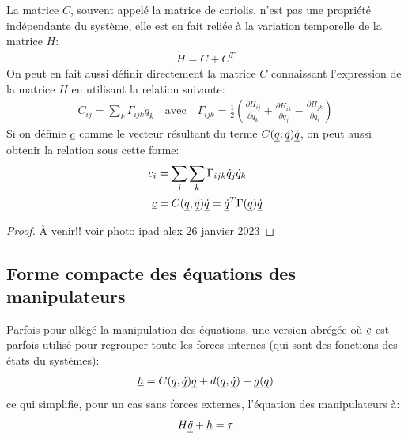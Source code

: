 La matrice $C$, souvent appelé la matrice de coriolis, n'est pas une propriété indépendante du système, elle est en fait reliée à la variation temporelle de la matrice $H$:
\begin{align}
\dot{H} = C + C^T
\label{eq:cener}
\end{align}
On peut en fait aussi définir directement la matrice $C$ connaissant l'expression de la matrice $H$ en utilisant la relation suivante:
\begin{align}
C_{ij} = \sum_k \Gamma_{ijk} \dot{q}_k \quad \text{avec} \quad \Gamma_{ijk} = \frac{1}{2}\left(  \frac{\partial H_{ij}}{\partial q_k} + \frac{\partial H_{ik}}{\partial q_j} - \frac{\partial H_{jk}}{\partial q_i}   \right)
\end{align}
Si on définie $\underline{c}$ comme le vecteur résultant du terme $C(\underline{q},\underline{\dot{q}})\underline{\dot{q}}$, on peut aussi obtenir la relation sous cette forme:
\begin{align}
c_i &= \sum_j \sum_k \Gamma_{ijk} \dot{q}_j \dot{q}_k \\ 
\underline{c} &= C(\underline{q},\underline{\dot{q}})\underline{\dot{q}} = \underline{\dot{q}}^T \Gamma(\underline{q}) \underline{\dot{q}}
\end{align}

\begin{proof}
À venir!! voir photo ipad alex 26 janvier 2023
\end{proof}

%


\newpage
\subsection{Forme compacte des équations des manipulateurs}

Parfois pour allégé la manipulation des équations, une version abrégée où $\underline{c}$ est parfois utilisé pour regrouper toute les forces internes (qui sont des fonctions des états du systèmes):
\begin{align}
\underline{h} = C(\underline{q},\underline{\dot{q}}) \underline{\dot{q}} + d(\underline{q}, \underline{\dot{q}}) + \underline{g}(\underline{q})
\end{align}
ce qui simplifie, pour un cas sans forces externes, l'équation des manipulateurs à:
\begin{align}
H \underline{\ddot{q}} + \underline{h} = \underline{\tau} 
\label{eq:manipulator_short}
\end{align}


